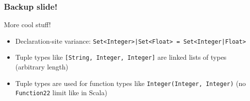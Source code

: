 \documentclass[aspectratio=169]{beamer}
\begin{document}
\begin{frame}
  \frametitle{Backup slide!}
  More cool stuff!
  \begin{itemize}
  \item Declaration-site variance: \lstinline{Set<Integer>|Set<Float> = Set<Integer|Float>}
  \item Tuple types like \lstinline{[String, Integer, Integer]} are linked lists of types (arbitrary length)
  \item Tuple types are used for function types like \lstinline{Integer(Integer, Integer)} (no \lstinline{Function22} limit like in Scala)
  \end{itemize}
\end{frame}
\end{document}
